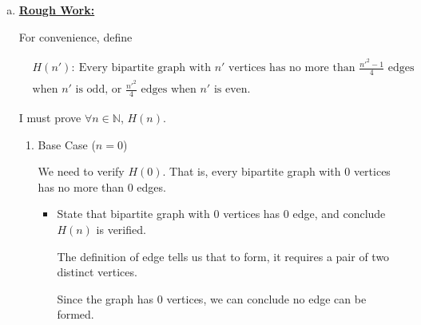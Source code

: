\documentclass[12pt]{article}
\begin{document}
\begin{enumerate}[a.]




    \item

    \bigskip

    \begin{mdframed}
        \underline{\textbf{Rough Work:}}

        \bigskip

        For convenience, define

        \begin{align*}
        & H(n'):\:\text{Every bipartite graph with $n'$ vertices has no more than
        $\frac{n'^2-1}{4}$ edges}\\
        & \text{when $n'$ is odd, or $\frac{n'^2}{4}$ edges when $n'$ is even.}
        \end{align*}

        \bigskip

        I must prove $\forall n \in \mathbb{N}$, $H(n)$.

        \bigskip

        \begin{enumerate}[1.]
            \item Base Case ($n = 0$)

            \bigskip

            We need to verify $H(0)$. That is, every bipartite graph with 0 vertices
            has no more than 0 edges.

            \bigskip

            \begin{itemize}
                \item State that bipartite graph with 0 vertices has 0 edge, and conclude $H(n)$ is verified.

                \begin{mdframed}
                The definition of edge tells us that to form, it requires a pair of two
                distinct vertices.

                \bigskip

                Since the graph has 0 vertices, we can conclude no edge can be
                formed.
                \end{mdframed}
            \end{itemize}


\end{enumerate}
\end{mdframed}
\end{enumerate}
\end{document}
